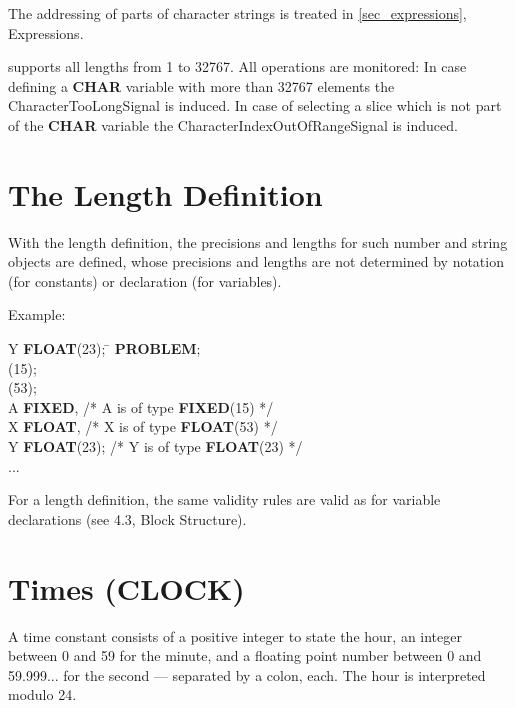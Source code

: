 The addressing of parts of character strings is treated in
 \ref{sec_expressions}, Expressions.

\OpenPEARL{} supports all lengths from 1 to 32767.
All operations are monitored:
In case defining a {\bf CHAR} variable with more than 32767 elements the
CharacterTooLongSignal is induced.
In case of selecting a slice which is not part of the {\bf CHAR} variable the 
CharacterIndexOutOfRangeSignal is induced.

\section{The Length Definition}   %
\label{sec_length}

With the length definition, the precisions and lengths for such
number and string objects are defined, whose precisions and lengths are
not determined by notation (for constants) or declaration (for
variables).


Example:

\begin{tabbing}
\x \x Y {\bf FLOAT}(23); \x \= \kill
{\bf PROBLEM}; \> \\
(15); \> \\
(53); \> \\
 A {\bf FIXED}, \> /* A is of type {\bf FIXED}(15) */ \\
\x \x X {\bf FLOAT},        \> /* X is of type {\bf FLOAT}(53) */ \\
\x \x Y {\bf FLOAT}(23);    \> /* Y is of type {\bf FLOAT}(23) */ \\
\x ... \> \\
\end{tabbing}

For a length definition, the same validity rules are valid as for
variable declarations (see 4.3, Block Structure).

\section{Times (CLOCK)}   %
\label{sec_type_clock}

A time constant consists of a positive integer to state the hour, an
integer between 0 and 59 for the minute, and a floating point number
between 0 and 59.999... for the second --- separated by a colon, each.
The hour is interpreted modulo 24.


